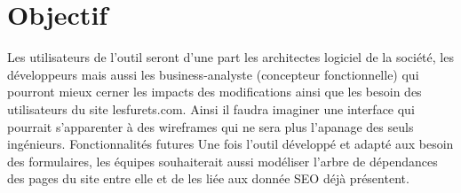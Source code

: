 \section{Objectif}
Les utilisateurs de l’outil seront d’une part les architectes logiciel de la société, les développeurs mais aussi les business-analyste (concepteur fonctionnelle) qui pourront mieux cerner les impacts des modifications ainsi que les besoin des utilisateurs du site lesfurets.com. Ainsi il faudra imaginer une interface qui pourrait s'apparenter à des wireframes qui ne sera plus l’apanage des seuls ingénieurs.
Fonctionnalités futures
Une fois l’outil développé et adapté aux besoin des formulaires, les équipes souhaiterait aussi modéliser l’arbre de dépendances des pages du site entre elle et de les liée aux donnée SEO déjà présentent.

